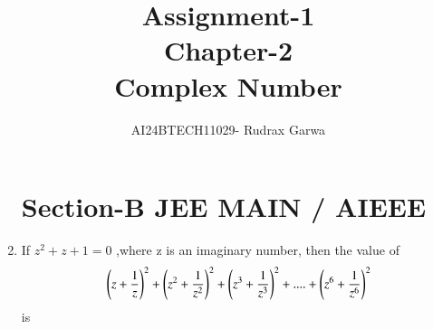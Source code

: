 \documentclass[journal,12pt,twocolumn,article]{IEEEtran}
\theoremstyle{remark}
\begin{document}
                                   
\begin{enumerate}[start = 14]                      

                                      
\title{Assignment-1 \\Chapter-2\\Complex Number}
\author{AI24BTECH11029- Rudrax Garwa}              
\maketitle
\newpage                                           
\bigskip
\section*{Section-B   JEE MAIN / AIEEE}
\item If $z^2+z+1=0$ ,where z is an imaginary number, then the value of
\begin{align*}
\left(z+\frac{1}{z}\right)^2 + \left(z^2+\frac{1}{z^2}\right)^2 + \left(z^3 +\frac{1}{z^3}\right)^2 +....+\left(z^6 +\frac{1}{z^6}\right)^2
\end{align*} 
is


\end{enumerate}
\end{document}

